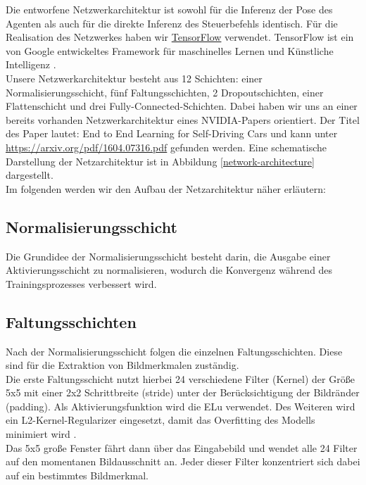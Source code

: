 Die entworfene Netzwerkarchitektur ist sowohl für die Inferenz der Pose des Agenten als auch für die direkte Inferenz des Steuerbefehls identisch.
Für die Realisation des Netzwerkes haben wir \href{https://www.tensorflow.org/}{TensorFlow} verwendet. TensorFlow ist ein von Google entwickeltes Framework für maschinelles Lernen und Künstliche Intelligenz \cite{bigdata}. \\

Unsere Netzwerkarchitektur besteht aus 12 Schichten: einer Normalisierungsschicht, fünf Faltungsschichten, 2 Dropoutschichten, einer Flattenschicht und drei Fully-Connected-Schichten.
Dabei haben wir uns an einer bereits vorhanden Netzwerkarchitektur eines NVIDIA-Papers orientiert. Der Titel des Paper lautet: \glqq End to End Learning for Self-Driving Cars\grqq{} und kann unter \href{https://arxiv.org/pdf/1604.07316.pdf}{https://arxiv.org/pdf/1604.07316.pdf} gefunden werden.
Eine schematische Darstellung der Netzarchitektur ist in Abbildung \ref{network-architecture} dargestellt. \\

Im folgenden werden wir den Aufbau der Netzarchitektur näher erläutern:

\subsection{Normalisierungsschicht}
Die Grundidee der Normalisierungsschicht besteht darin, die Ausgabe einer Aktivierungsschicht zu normalisieren, wodurch die Konvergenz während des Trainingsprozesses verbessert wird. \cite{tensorflow}

\subsection{Faltungsschichten}
Nach der Normalisierungsschicht folgen die einzelnen Faltungsschichten. Diese sind für die Extraktion von Bildmerkmalen zuständig. \\

Die erste Faltungsschicht nutzt hierbei 24 verschiedene Filter (Kernel) der Größe 5x5 mit einer 2x2 Schrittbreite (stride) unter der Berücksichtigung der Bildränder (padding). Als Aktivierungsfunktion wird die ELu verwendet. Des Weiteren wird ein L2-Kernel-Regularizer eingesetzt, damit das Overfitting des Modells minimiert wird \cite{tensorflow2}.  \\ 
Das 5x5 große Fenster fährt dann über das Eingabebild und wendet alle 24 Filter auf den momentanen Bildausschnitt an. Jeder dieser Filter konzentriert sich dabei auf ein bestimmtes Bildmerkmal. \\


